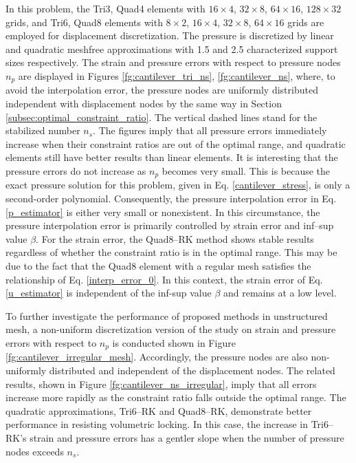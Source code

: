 In this problem, the Tri3, Quad4 elements with $16\times 4$, $32\times 8$, $64\times 16$, $128\times 32$ grids, and Tri6, Quad8 elements with $8\times 2$, $16\times 4$, $32\times 8$, $64\times 16$ grids are employed for displacement discretization. The pressure is discretized by linear and quadratic meshfree approximations with 1.5 and 2.5 characterized support sizes respectively.
The strain and pressure errors with respect to pressure nodes $n_p$ are displayed in Figures \ref{fg:cantilever_tri_ns}, \ref{fg:cantilever_ns}, where, to avoid the interpolation error, the pressure nodes are uniformly distributed independent with displacement nodes by the same way in Section \ref{subsec:optimal_constraint_ratio}. 
The vertical dashed lines stand for the stabilized number $n_s$.
The figures imply that all pressure errors immediately increase when their constraint ratios are out of the optimal range,
and quadratic elements still have better results than linear elements.
It is interesting that the pressure errors do not increase as $n_p$ becomes very small.
This is because the exact pressure solution for this problem, given in Eq. \eqref{cantilever_stress}, is only a second-order polynomial.
Consequently, the pressure interpolation error in Eq. \eqref{p_estimator} is either very small or nonexistent.
In this circumstance, the pressure interpolation error is primarily controlled by strain error and inf--sup value $\beta$.
For the strain error, the Quad8--RK method shows stable results regardless of whether the constraint ratio is in the optimal range.
This may be due to the fact that the Quad8 element with a regular mesh satisfies the relationship of Eq. \eqref{interp_error_0}.
In this context, the strain error of Eq. \eqref{u_estimator} is independent of the inf-sup value $\beta$ and remains at a low level.

To further investigate the performance of proposed methods in unstructured mesh, a non-uniform discretization version of the study on strain and pressure errors with respect to $n_p$ is conducted shown in Figure \ref{fg:cantilever_irregular_mesh}.
Accordingly, the pressure nodes are also non-uniformly distributed and independent of the displacement nodes.
The related results, shown in Figure \ref{fg:cantilever_ns_irregular}, imply that all errors increase more rapidly as the constraint ratio falls outside the optimal range.
The quadratic approximations, Tri6--RK and Quad8--RK, demonstrate better performance in resisting volumetric locking.
In this case, the increase in Tri6--RK's strain and pressure errors has a gentler slope when the number of pressure nodes exceeds $n_s$.

